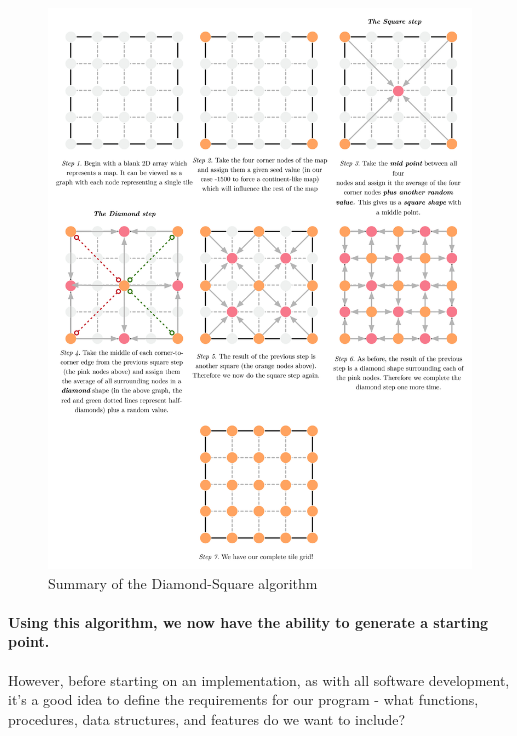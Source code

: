 \documentclass{article}
\begin{document}
\begin{figure}[H]
	\centering
	\includegraphics[width=0.9\linewidth,trim=4 4 4 4,clip]{diamondsquare.jpg}
	\renewcommand{\figurename}{Example}
	\caption{Summary of the Diamond-Square algorithm}\label{fig:graph}
\end{figure}
	
\paragraph{Using this algorithm, we now have the ability to generate a starting point.}
However, before starting on an implementation, as with all software development, it's a good idea to define the requirements for our program - what functions, procedures, data structures, and features do we want to include?
\end{document}
